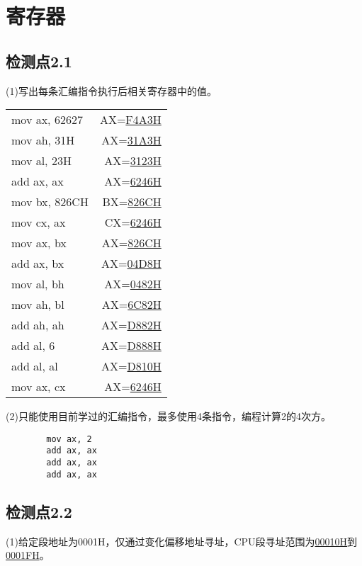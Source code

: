 \documentclass{elegantnote}
\begin{document}
    \section{寄存器}
    \subsection*{检测点2.1}
    (1)写出每条汇编指令执行后相关寄存器中的值。\par
    \begin{tabular}{lr}
        mov ax, 62627   &   AX=\underline{F4A3H} \\
        mov ah, 31H     &   AX=\underline{31A3H} \\
        mov al, 23H     &   AX=\underline{3123H} \\
        add ax, ax      &   AX=\underline{6246H} \\
        mov bx, 826CH   &   BX=\underline{826CH} \\
        mov cx, ax      &   CX=\underline{6246H} \\
        mov ax, bx      &   AX=\underline{826CH} \\
        add ax, bx      &   AX=\underline{04D8H} \\
        mov al, bh      &   AX=\underline{0482H} \\
        mov ah, bl      &   AX=\underline{6C82H} \\
        add ah, ah      &   AX=\underline{D882H} \\
        add al, 6       &   AX=\underline{D888H} \\
        add al, al      &   AX=\underline{D810H} \\
        mov ax, cx      &   AX=\underline{6246H} \\
    \end{tabular}\par
    (2)只能使用目前学过的汇编指令，最多使用4条指令，编程计算2的4次方。
    \begin{verbatim}
        mov ax, 2
        add ax, ax
        add ax, ax
        add ax, ax
    \end{verbatim}
    \subsection*{检测点2.2}
    (1)给定段地址为0001H，仅通过变化偏移地址寻址，CPU段寻址范围为\underline{00010H}到\underline{0001FH}。\par
    
\end{document}
